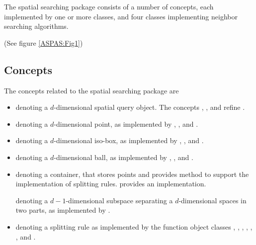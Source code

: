 The spatial searching package consists of a number of concepts, each implemented by
one or more classes, and four classes implementing neighbor 
searching algorithms. 
\begin{ccTexOnly}
(See figure \ref{ASPAS:Fig1}) 
\end{ccTexOnly}

\subsection{Concepts}

The concepts related to the spatial searching package are

\begin{itemize}

\item
{} denoting a $d$-dimensional spatial query object. The concepts
, , and  refine .

\item 
{} 
denoting a $d$-dimensional point, as implemented by 
, , and .

\item
{} 
denoting a $d$-dimensional iso-box, as implemented
by
, , 
and .

\item
{}
denoting a $d$-dimensional ball, as implemented by
, ,
and .


\item
{} denoting a container, that stores points and
provides method to support the implementation of splitting rules. 
 provides an implementation.


 denoting a $d-1$-dimensional
subspace separating a $d$-dimensional spaces in two parts,
as implemented by .

\item 
{} denoting a splitting rule as implemented by the function object classes 
,
,
,
,
,
, and
.


\end{itemize}
